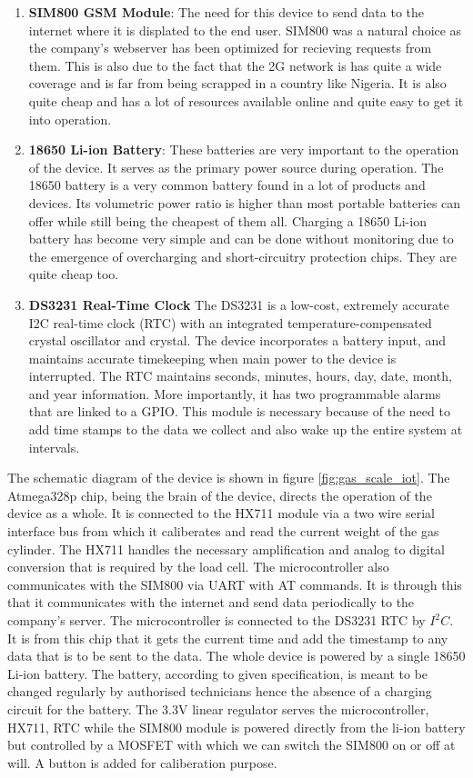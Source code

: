 \begin{enumerate}
\item \textbf{SIM800 GSM Module}: The need for this device to send data to the internet where it is displated to the end  user. SIM800 was a natural choice as the company's webserver has been optimized for recieving requests from them. This is also due to the fact that the 2G network is has quite a wide coverage and is far from being scrapped in a country like Nigeria. It is also quite cheap and has a lot of resources available online and quite easy to get it into operation. 

\item \textbf{18650 Li-ion Battery}: These batteries are very important to the operation of the device. It serves as the primary power source  during operation. The 18650 battery is a very common battery found in a lot of products and devices. Its volumetric power ratio is higher than most portable batteries can offer while still being the cheapest of them all. Charging a 18650 Li-ion battery has become very simple and can be done without monitoring due to the emergence of overcharging and short-circuitry protection chips.  They are quite cheap too. 

\item \textbf{DS3231 Real-Time Clock} The DS3231 is a low-cost, extremely accurate I2C real-time clock (RTC) with an integrated  temperature-compensated crystal oscillator and crystal. The device incorporates a battery input, and  maintains  accurate timekeeping when main  power to the device is interrupted. The RTC maintains seconds, minutes, hours, day, date, month, and year  information. More importantly, it has two programmable alarms that are linked to a GPIO. This module is necessary because of the need to add time stamps to the data we collect and also wake up the entire system at intervals.
\end{enumerate}
The schematic diagram of the device is shown in figure \ref{fig:gas_scale_iot}. The Atmega328p chip, being the brain of the device, directs the operation of the device as a whole. It is connected to the HX711 module via a two wire serial interface bus from which it caliberates and read the current weight of the gas cylinder. The HX711 handles the necessary amplification and analog to digital conversion that is required by the load cell. The microcontroller also communicates with the SIM800 via UART with AT commands. It is through this that it communicates with the internet and send data periodically to the company's server. The microcontroller is connected to the DS3231 RTC by $I^2C$. It is from this chip that it gets the current time and add the timestamp to any data that is to be sent to the data. The whole device is powered by a single 18650 Li-ion battery. The battery, according to given specification, is meant to be changed regularly by authorised technicians hence the absence of a charging circuit for the battery. The 3.3V linear regulator serves the microcontroller, HX711, RTC while the SIM800 module is powered directly from the li-ion battery but controlled by a MOSFET with which we can switch the SIM800 on or off at will. A button is added for caliberation purpose.


